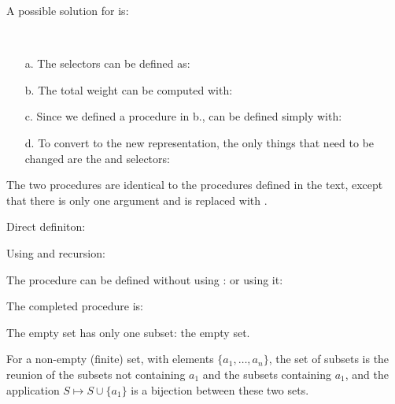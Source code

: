 \begin{exe}[2.28]
    A possible solution for  is:
\end{exe}

\begin{exe}[2.29]
    \ \vspace{-20pt}
    \begin{itemize}
        \item[a.] The selectors can be defined as:
        \item[b.] The total weight can be computed with:
        \item[c.] Since we defined a  procedure in b., 
             can be defined simply with:
        \item[d.] To convert to the new representation, the only things that 
            need to be changed are the  and 
             selectors:
    \end{itemize}
\end{exe}

\begin{exe}[2.30]
    The two  procedures are identical to the  
    procedures defined in the text, except that there is only one argument and 
     is replaced with .

    Direct definiton:

    Using  and recursion:
\end{exe}

\begin{exe}[2.31]
    The procedure  can be defined without using :
    or using it:
\end{exe}

\begin{exe}[2.32]
    The completed procedure is:

    The empty set has only one subset: the empty set.

    For a non-empty (finite) set, with elements $\{a_1, …, a_n\}$, the set of 
    subsets is the reunion of the subsets not containing $a_1$ and the subsets 
    containing $a_1$, and the application $S \mapsto S \cup \{a_1\}$ is 
    a bijection between these two sets.
\end{exe}

